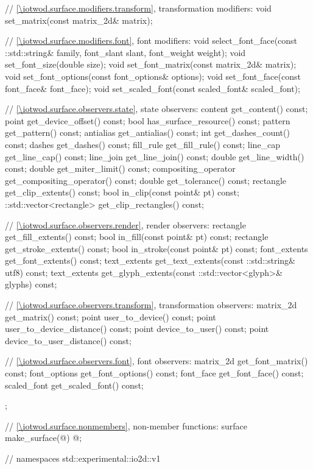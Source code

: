 \begin{codeblock}
{{{{{    // \ref{\iotwod.surface.modifiers.transform}, transformation modifiers:
    void set_matrix(const matrix_2d& matrix);

    // \ref{\iotwod.surface.modifiers.font}, font modifiers:
    void select_font_face(const ::std::string& family, font_slant slant, 
      font_weight weight);
    void set_font_size(double size);
    void set_font_matrix(const matrix_2d& matrix);
    void set_font_options(const font_options& options);
    void set_font_face(const font_face& font_face);
    void set_scaled_font(const scaled_font& scaled_font);

    // \ref{\iotwod.surface.observers.state}, state observers:
    content get_content() const;
    point get_device_offset() const;
    bool has_surface_resource() const;
    pattern get_pattern() const;
    antialias get_antialias() const;
    int get_dashes_count() const;
    dashes get_dashes() const;
    fill_rule get_fill_rule() const;
    line_cap get_line_cap() const;
    line_join get_line_join() const;
    double get_line_width() const;
    double get_miter_limit() const;
    compositing_operator get_compositing_operator() const;
    double get_tolerance() const;
    rectangle get_clip_extents() const;
    bool in_clip(const point& pt) const;
    ::std::vector<rectangle> get_clip_rectangles() const;

    // \ref{\iotwod.surface.observers.render}, render observers:
    rectangle get_fill_extents() const;
    bool in_fill(const point& pt) const;
    rectangle get_stroke_extents() const;
    bool in_stroke(const point& pt) const;
    font_extents get_font_extents() const;
    text_extents get_text_extents(const ::std::string& utf8) const;
    text_extents get_glyph_extents(const ::std::vector<glyph>& glyphs) const;

    // \ref{\iotwod.surface.observers.transform}, transformation observers:
    matrix_2d get_matrix() const;
    point user_to_device() const;
    point user_to_device_distance() const;
    point device_to_user() const;
    point device_to_user_distance() const;

    // \ref{\iotwod.surface.observers.font}, font observers:
    matrix_2d get_font_matrix() const;
    font_options get_font_options() const;
    font_face get_font_face() const;
    scaled_font get_scaled_font() const;
  };
  
  // \ref{\iotwod.surface.nonmembers}, non-member functions:
  surface make_surface(@\impdef@) @\impdef@;
} } } } // namespaces std::experimental::io2d::v1
\end{codeblock}

